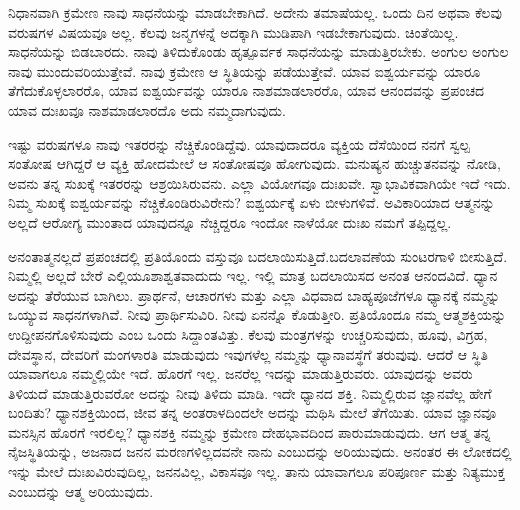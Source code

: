 ನಿಧಾನವಾಗಿ ಕ್ರಮೇಣ ನಾವು ಸಾಧನೆಯನ್ನು ಮಾಡಬೇಕಾಗಿದೆ. ಅದೇನು ತಮಾಷೆಯಲ್ಲ. ಒಂದು ದಿನ ಅಥವಾ ಕೆಲವು ವರುಷಗಳ ವಿಷಯವೂ ಅಲ್ಲ. ಕೆಲವು ಜನ್ಮಗಳನ್ನೆ ಅದಕ್ಕಾಗಿ ಮುಡಿಪಾಗಿ ಇಡಬೇಕಾಗುವುದು. ಚಿಂತೆಯಿಲ್ಲ. ಸಾಧನೆಯನ್ನು ಬಿಡಬಾರದು. ನಾವು ತಿಳಿದುಕೊಂಡು ಹೃತ್ಪೂರ್ವಕ ಸಾಧನೆಯನ್ನು ಮಾಡುತ್ತಿರಬೇಕು. ಅಂಗುಲ ಅಂಗುಲ ನಾವು ಮುಂದುವರಿಯುತ್ತೇವೆ. ನಾವು ಕ್ರಮೇಣ ಆ ಸ್ಥಿತಿಯನ್ನು ಪಡೆಯುತ್ತೇವೆ. ಯಾವ ಐಶ್ವರ್ಯವನ್ನು ಯಾರೂ ತೆಗೆದುಕೊಳ್ಳಲಾರರೊ, ಯಾವ ಐಶ್ವರ್ಯವನ್ನು ಯಾರೂ ನಾಶಮಾಡಲಾರರೊ, ಯಾವ ಆನಂದವನ್ನು ಪ್ರಪಂಚದ ಯಾವ ದುಃಖವೂ ನಾಶಮಾಡಲಾರದೊ ಅದು ನಮ್ಮದಾಗುವುದು.

ಇಷ್ಟು ವರುಷಗಳೂ ನಾವು ಇತರರನ್ನು ನೆಚ್ಚಿಕೊಂಡಿದ್ದೆವು. ಯಾವುದಾದರೂ ವ್ಯಕ್ತಿಯ ದೆಸೆಯಿಂದ ನನಗೆ ಸ್ವಲ್ಪ ಸಂತೋಷ ಆಗಿದ್ದರೆ ಆ ವ್ಯಕ್ತಿ ಹೋದಮೇಲೆ ಆ ಸಂತೋಷವೂ ಹೋಗುವುದು. ಮನುಷ್ಯನ ಹುಚ್ಚುತನವನ್ನು ನೋಡಿ, ಅವನು ತನ್ನ ಸುಖಕ್ಕೆ ಇತರರನ್ನು ಆಶ್ರಯಿಸಿರುವನು. ಎಲ್ಲಾ ವಿಯೋಗವೂ ದುಃಖವೇ. ಸ್ವಾಭಾವಿಕವಾಗಿಯೇ ಇದೆ ಇದು. ನಿಮ್ಮ ಸುಖಕ್ಕೆ ಐಶ್ವರ್ಯವನ್ನು ನೆಚ್ಚಿಕೊಂಡಿರುವಿರೇನು? ಐಶ್ವರ್ಯಕ್ಕೆ ಏಳು ಬೀಳುಗಳಿವೆ. ಅವಿಕಾರಿಯಾದ ಆತ್ಮನನ್ನು ಅಲ್ಲದೆ ಆರೋಗ್ಯ ಮುಂತಾದ ಯಾವುದನ್ನೂ ನೆಚ್ಚಿದ್ದರೂ ಇಂದೋ ನಾಳೆಯೋ ದುಃಖ ನಮಗೆ ತಪ್ಪಿದ್ದಲ್ಲ.

ಅನಂತಾತ್ಮನಲ್ಲದೆ ಪ್ರಪಂಚದಲ್ಲಿ ಪ್ರತಿಯೊಂದು ವಸ್ತುವೂ ಬದಲಾಯಿಸುತ್ತಿದೆ.\break ಬದಲಾವಣೆಯ ಸುಂಟರಗಾಳಿ ಬೀಸುತ್ತಿದೆ. ನಿಮ್ಮಲ್ಲಿ ಅಲ್ಲದೆ ಬೇರೆ ಎಲ್ಲಿಯೂ\break ಶಾಶ್ವತವಾದುದು ಇಲ್ಲ. ಇಲ್ಲಿ ಮಾತ್ರ ಬದಲಾಯಿಸದ ಅನಂತ ಆನಂದವಿದೆ. ಧ್ಯಾನ ಅದನ್ನು ತೆರೆಯುವ ಬಾಗಿಲು. ಪ್ರಾರ್ಥನೆ, ಆಚಾರಗಳು ಮತ್ತು ಎಲ್ಲಾ ವಿಧವಾದ ಬಾಹ್ಯಪೂಜೆಗಳೂ ಧ್ಯಾನಕ್ಕೆ ನಮ್ಮನ್ನು ಒಯ್ಯುವ ಸಾಧನಗಳಾಗಿವೆ. ನೀವು ಪ್ರಾರ್ಥಿಸುವಿರಿ. ನೀವು ಏನನ್ನೊ ಕೊಡುತ್ತೀರಿ. ಪ್ರತಿಯೊಂದೂ ನಮ್ಮ ಆತ್ಮಶಕ್ತಿಯನ್ನು ಉದ್ದೀಪನಗೊಳಿಸುವುದು ಎಂಬ ಒಂದು ಸಿದ್ದಾಂತವಿತ್ತು. ಕೆಲವು ಮಂತ್ರಗಳನ್ನು ಉಚ್ಚರಿಸುವುದು, ಹೂವು, ವಿಗ್ರಹ, ದೇವಸ್ಥಾನ, ದೇವರಿಗೆ ಮಂಗಳಾರತಿ ಮಾಡುವುದು ಇವುಗಳೆಲ್ಲ ನಮ್ಮನ್ನು ಧ್ಯಾನಾವಸ್ಥೆಗೆ ತರುವುವು. ಆದರೆ ಆ ಸ್ಥಿತಿ ಯಾವಾಗಲೂ ನಮ್ಮಲ್ಲಿಯೇ ಇದೆ. ಹೊರಗೆ ಇಲ್ಲ. ಜನರೆಲ್ಲ ಇದನ್ನು ಮಾಡುತ್ತಿರುವರು. ಯಾವುದನ್ನು ಅವರು ತಿಳಿಯದೆ ಮಾಡುತ್ತಿರುವರೋ ಅದನ್ನು ನೀವು ತಿಳಿದು ಮಾಡಿ. ಇದೇ ಧ್ಯಾನದ ಶಕ್ತಿ. ನಿಮ್ಮಲ್ಲಿರುವ ಜ್ಞಾನವೆಲ್ಲ ಹೇಗೆ ಬಂದಿತು? ಧ್ಯಾನಶಕ್ತಿಯಿಂದ, ಜೀವ ತನ್ನ ಅಂತರಾಳದಿಂದಲೇ ಅದನ್ನು ಮಥಿಸಿ ಮೇಲೆ ತೆಗೆಯಿತು. ಯಾವ ಜ್ಞಾನವೂ ಮನಸ್ಸಿನ ಹೊರಗೆ ಇರಲಿಲ್ಲ? ಧ್ಯಾನಶಕ್ತಿ ನಮ್ಮನ್ನು ಕ್ರಮೇಣ ದೇಹಭಾವದಿಂದ ಪಾರುಮಾಡುವುದು. ಆಗ ಆತ್ಮ ತನ್ನ ನೈಜಸ್ಥಿತಿಯನ್ನು, ಅಜನಾದ ಜನನ ಮರಣಗಳಿಲ್ಲದವನೇ ನಾನು ಎಂಬುದನ್ನು ಅರಿಯುವುದು. ಅನಂತರ ಈ ಲೋಕದಲ್ಲಿ ಇನ್ನು ಮೇಲೆ ದುಃಖವಿರುವುದಿಲ್ಲ, ಜನನವಿಲ್ಲ, ವಿಕಾಸವೂ ಇಲ್ಲ. ತಾನು ಯಾವಾಗಲೂ ಪರಿಪೂರ್ಣ ಮತ್ತು ನಿತ್ಯಮುಕ್ತ ಎಂಬುದನ್ನು ಆತ್ಮ ಅರಿಯುವುದು.

